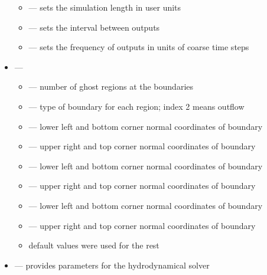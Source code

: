 \begin{itemize}
\begin{itemize}
    \item {} --- sets the simulation length in user units\\[-9pt]
    \item {} --- sets the interval between outputs\\[-9pt]
    \item {} --- sets the frequency of outputs in units of coarse time steps\\[-3pt]
  \end{itemize}
  \item {} \quad--- \\[-9pt]
  \begin{itemize}
    \item {} --- number of ghost regions at the boundaries\\[-9pt]
    \item {} --- type of boundary for each region; index 2 means outflow\\[-9pt]
    \item {} --- lower left and bottom corner normal coordinates of boundary \\[-9pt]
    \item {} --- upper right and top corner normal coordinates of boundary \\[-9pt]
    \item {} --- lower left and bottom corner normal coordinates of boundary \\[-9pt]
    \item {} --- upper right and top corner normal coordinates of boundary \\[-9pt]
    \item {} --- lower left and bottom corner normal coordinates of boundary \\[-9pt]
    \item {} --- upper right and top corner normal coordinates of boundary \\[-9pt]
    \item default values were used for the rest \\[-3pt]
  \end{itemize}
  \item {} \quad --- provides parameters for the hydrodynamical solver\\[-9pt]

\end{itemize}
